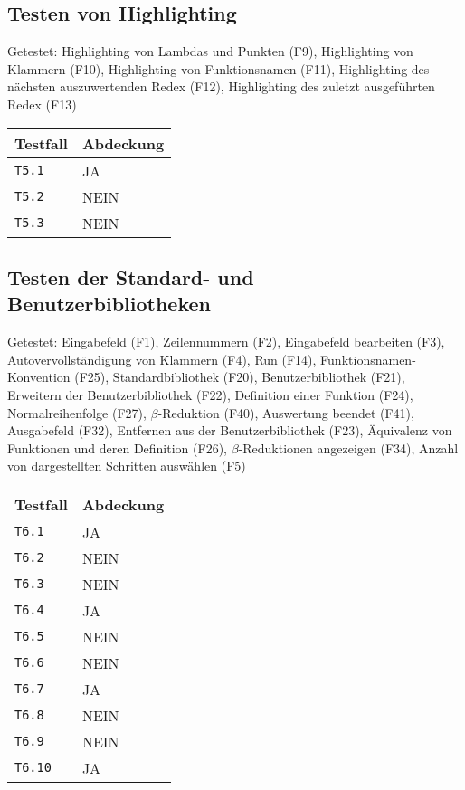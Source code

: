 \documentclass[parskip=full,11pt,twoside]{scrartcl}
\begin{document}
\subsection{Testen von Highlighting}
    Getestet: Highlighting von Lambdas und Punkten (F9), Highlighting von Klammern (F10), Highlighting von Funktionsnamen (F11), Highlighting des nächsten auszuwertenden Redex (F12), Highlighting des zuletzt ausgeführten Redex (F13)

	\label{shortcuts}
	\begin{center}
		\begin{tabular}{ p{9cm} p{4cm}}
    			Testfall & Abdeckung \\ \hline
    			\texttt{T5.1} & \cellcolor{green!20}JA \\ \hline
    			\texttt{T5.2} & \cellcolor{red!20}NEIN \\ \hline
			\texttt{T5.3} & \cellcolor{red!20}NEIN \\ \hline
		\end{tabular}
	\end{center}

\subsection{Testen der Standard- und Benutzerbibliotheken}
    Getestet: Eingabefeld (F1), Zeilennummern (F2), Eingabefeld bearbeiten (F3), Autovervollständigung von Klammern (F4), Run (F14), Funktionsnamen-Konvention (F25), Standardbibliothek (F20), Benutzerbibliothek (F21), Erweitern der Benutzerbibliothek (F22), Definition einer Funktion (F24), Normalreihenfolge (F27), $\beta$-Reduktion (F40), Auswertung beendet (F41), Ausgabefeld (F32), Entfernen aus der Benutzerbibliothek (F23), Äquivalenz von Funktionen und deren Definition (F26), $\beta$-Reduktionen angezeigen (F34), Anzahl von dargestellten Schritten auswählen (F5)

	\label{shortcuts}
	\begin{center}
		\begin{tabular}{ p{9cm} p{4cm}}
    			Testfall & Abdeckung \\ \hline
    			\texttt{T6.1} & \cellcolor{green!20}JA \\ \hline
    			\texttt{T6.2} & \cellcolor{red!20}NEIN \\ \hline
			\texttt{T6.3} & \cellcolor{red!20}NEIN \\ \hline
			\texttt{T6.4} & \cellcolor{green!20}JA \\ \hline
    			\texttt{T6.5} & \cellcolor{red!20}NEIN \\ \hline
			\texttt{T6.6} & \cellcolor{red!20}NEIN \\ \hline
			\texttt{T6.7} & \cellcolor{green!20}JA \\ \hline
    			\texttt{T6.8} & \cellcolor{red!20}NEIN \\ \hline
			\texttt{T6.9} & \cellcolor{red!20}NEIN \\ \hline
			\texttt{T6.10} & \cellcolor{green!20}JA \\ \hline
		\end{tabular}
	\end{center}
\end{document}
